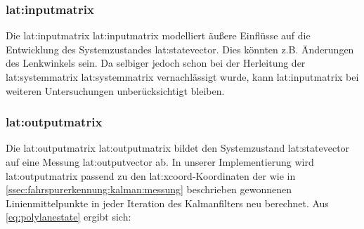 \subsubsection{\glsdesc{lat:inputmatrix}}
Die \glsdesc{lat:inputmatrix} \gls{lat:inputmatrix} modelliert äußere Einflüsse auf die Entwicklung des Systemzustandes \gls{lat:statevector}. Dies könnten z.B. Änderungen des Lenkwinkels sein. Da selbiger jedoch schon bei der Herleitung der \glsdesc{lat:systemmatrix} \gls{lat:systemmatrix} vernachlässigt wurde, kann \gls{lat:inputmatrix} bei weiteren Untersuchungen unberücksichtigt bleiben.

\subsubsection{\glsdesc{lat:outputmatrix}} 
\label{sssec:fahrspurerkennung:kalman-filter:zustandsraumbeschreibung:outputmatrix}
Die \glsdesc{lat:outputmatrix} \gls{lat:outputmatrix} bildet den Systemzustand \gls{lat:statevector} auf eine Messung \gls{lat:outputvector} ab. In unserer Implementierung wird  \gls{lat:outputmatrix} passend zu den \gls{lat:xcoord}-Koordinaten der wie in \ref{ssec:fahrspurerkennung:kalman:messung} beschrieben gewonnenen Linienmittelpunkte in jeder Iteration des Kalmanfilters neu berechnet. Aus \ref{eq:polylanestate} ergibt sich:
